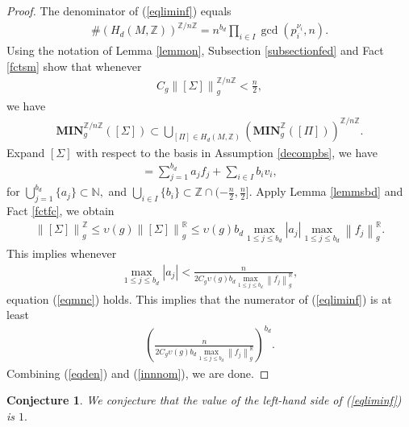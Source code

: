 \documentclass[11pt,a4paper]{amsart}
\numberwithin{equation}{section}
\newcommand{\mn}{\mathbf{MIN}}
\newcommand{\Si}{\Sigma}
\newcommand{\s}{\subset}
\newcommand{\nog}[1]{\no{#1}^{\R}}
\newcommand{\no}[1]{\left\lVert#1\right\rVert}
\newcommand{\N}{\mathbb{N}}
\newcommand{\R}{\mathbb{R}}
\newcommand{\Z}{\mathbb{Z}}
\theoremstyle{plain}
\newtheorem{conj}{Conjecture}
\theoremstyle{definition}
\numberwithin{equation}{subsection}
\begin{document}
	\begin{proof}
		The denominator of (\ref{eqliminf}) equals 
		\begin{align}\label{eqden}
			\# \left(H_d(M,\Z)\right)^{\Z/n\Z}=n^{b_d}\prod_{i\in I}\operatorname{gcd}(p_i^{\nu_i},n).
		\end{align}
		Using the notation of Lemma \ref{lemmon}, Subsection \ref{subsectionfed} and Fact \ref{fctsm} show that whenever
		\begin{align*}
			C_g\no{[\Si]}_g^{\Z/n\Z}<\frac{n}{2},
		\end{align*}
		we have
		\begin{align}\label{eqmnc}
			\mn_g^{\Z/n\Z}\left([\Si]\right)\s\bigcup_{[\Pi]\in H_d(M,\Z)}\left(\mn_{g}^{\Z}\left([\Pi]\right)\right)^{\Z/n\Z}.
		\end{align}Expand $[\Si]$ with respect to the basis in Assumption \ref{decompbs}, we have
		\begin{align}
			[\Si]=\sum_{j=1}^{b_d}a_jf_j+\sum_{i\in I}b_iv_i,
		\end{align}for $\bigcup_{j=1}^{b_d}\{a_j\}\s \N,$ and $\bigcup_{i\in I}\{b_i\}\s \Z\cap (-\frac{n}{2},\frac{n}{2}].$ Apply Lemma \ref{lemmsbd} and Fact \ref{fctfc}, we obtain
		\begin{align*}
			\no{[\Si]}_g^{\Z}\le \upsilon(g)\nog{[\Si]}_g\le\upsilon(g)b_d\max_{1\le j\le b_d}|a_j|\max_{1\le j\le b_d}\nog{f_j}_g.
		\end{align*}
		This implies whenever
		\begin{align*}
			\max_{1\le j\le b_d}|a_j|<\frac{n}{2C_g\upsilon(g)b_d\max_{1\le j\le b_d}\nog{f_j}_g},
		\end{align*}
		equation (\ref{eqmnc}) holds. This implies that the numerator of (\ref{eqliminf}) is at least
		\begin{align}\label{innnom}
			\left(\frac{n}{2C_g\upsilon(g)b_d\max_{1\le j\le b_d}\nog{f_j}_g}\right)^{b_d}.
		\end{align}
		Combining (\ref{eqden}) and (\ref{innnom}), we are done.
	\end{proof}
	\begin{conj}
		We conjecture that the value of the left-hand side of (\ref{eqliminf}) is $1.$
	\end{conj}
\end{document}
